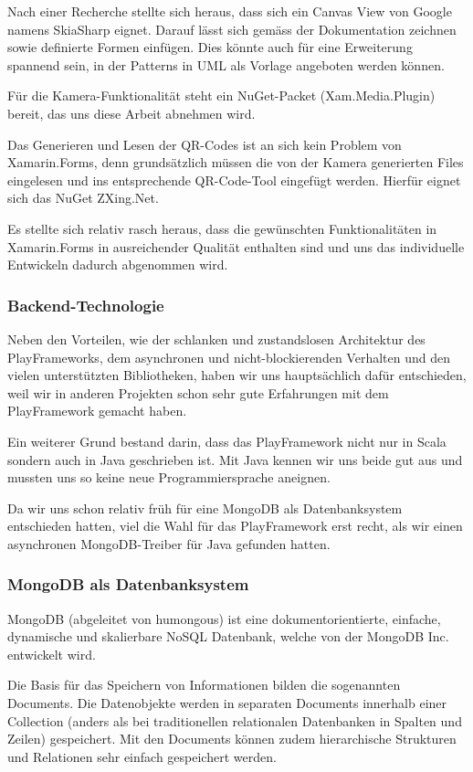 Nach einer Recherche stellte sich heraus, dass sich ein Canvas View von Google namens SkiaSharp eignet. Darauf lässt sich gemäss der Dokumentation zeichnen sowie definierte Formen einfügen. Dies könnte auch für eine Erweiterung spannend sein, in der Patterns in UML als Vorlage angeboten werden können.

Für die Kamera-Funktionalität steht ein NuGet-Packet (Xam.Media.Plugin) bereit, das uns diese Arbeit abnehmen wird.

Das Generieren und Lesen der QR-Codes ist an sich kein Problem von Xamarin.Forms, denn grundsätzlich müssen die von der Kamera generierten Files eingelesen und ins entsprechende QR-Code-Tool eingefügt werden. Hierfür eignet sich das NuGet ZXing.Net. 

Es stellte sich relativ rasch heraus, dass die gewünschten Funktionalitäten in Xamarin.Forms in ausreichender Qualität enthalten sind und uns das individuelle Entwickeln dadurch abgenommen wird.

\subsubsection{Backend-Technologie}
Neben den Vorteilen, wie der schlanken und zustandslosen Architektur des Play\-Frameworks, dem asynchronen und nicht-blockierenden Verhalten und den vielen unterstützten Bibliotheken, haben wir uns hauptsächlich dafür entschieden, weil wir in anderen Projekten schon sehr gute Erfahrungen mit dem PlayFramework gemacht haben.

Ein weiterer Grund bestand darin, dass das PlayFramework nicht nur in Scala sondern auch in Java geschrieben ist. Mit Java kennen wir uns beide gut aus und mussten uns so keine neue Programmiersprache aneignen.

Da wir uns schon relativ früh für eine MongoDB als Datenbanksystem entschieden hatten, viel die Wahl für das PlayFramework erst recht, als wir einen asynchronen MongoDB-Treiber für Java gefunden hatten.

\subsubsection{MongoDB als Datenbanksystem}
MongoDB (abgeleitet von humongous) ist eine dokumentorientierte, einfache, dynamische und skalierbare NoSQL Datenbank, welche von der MongoDB Inc. entwickelt wird. 

Die Basis für das Speichern von Informationen bilden die sogenannten Documents. Die Datenobjekte werden in separaten Documents innerhalb einer Collection (anders als bei traditionellen relationalen Datenbanken in Spalten und Zeilen) gespeichert. Mit den Documents können zudem  hierarchische Strukturen und Relationen sehr einfach gespeichert werden.

